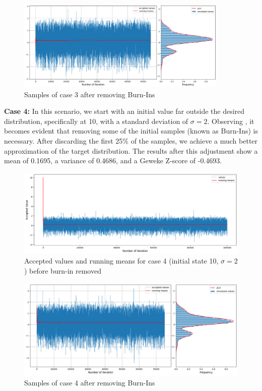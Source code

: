 \begin{example}
	\begin{figure}[H]
		\centering
		\includegraphics[width=0.9\textwidth]{./images/metropolis/example1/sample-3-value-hist-bo.png}
		\caption{Samples of case 3 after removing Burn-Ins}
		\label{fig:MH sample3 after burn in}
	\end{figure}

	\textbf{Case 4:} In this scenario, we start with an initial value far outside the desired distribution, specifically at 10, with a standard deviation of $\sigma = 2$. Observing , it becomes evident that removing some of the initial samples (known as Burn-Ins) is necessary. After discarding the first 25\% of the samples, we achieve a much better approximation of the target distribution. The results after this adjustment show a mean of 0.1695, a variance of 0.4686, and a Geweke Z-score of -0.4693.

	\begin{figure}[H]
		\centering
		\includegraphics[width=1\textwidth]{./images/metropolis/example1/sample-4-values.png}
		\caption{Accepted values and running means for case 4 (initial state 10, $ \sigma = 2 $) before burn-in removed}
		\label{fig:MH sample4}
	\end{figure}

	\begin{figure}[H]
		\centering
		\includegraphics[width=1\textwidth]{./images/metropolis/example1/sample-4-value-hist-bo.png}
		\caption{Samples of case 4 after removing Burn-Ins}
	\end{figure}


\end{example}
